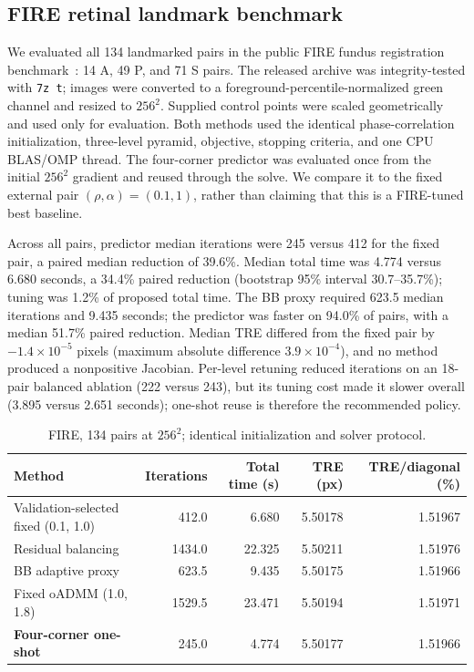 \documentclass[pdflatex,iicol,sn-mathphys-num]{sn-jnl}
\theoremstyle{definition}\newtheorem{definition}[theorem]{Definition}\newtheorem{remark}[theorem]{Remark}
\begin{document}
\subsection{FIRE retinal landmark benchmark}
We evaluated all 134 landmarked pairs in the public FIRE fundus registration
benchmark~\cite{HernandezMatas2017}: 14 A, 49 P, and 71 S pairs.  The released
archive was integrity-tested with \texttt{7z t}; images were converted to a
foreground-percentile-normalized green channel and resized to $256^2$.
Supplied control points were scaled geometrically and used only for evaluation.
Both methods used the identical phase-correlation initialization, three-level
pyramid, objective, stopping criteria, and one CPU BLAS/OMP thread.  The
four-corner predictor was evaluated once from the initial $256^2$
gradient and reused through the solve.  We compare it to the fixed external
pair $(\rho,\alpha)=(0.1,1)$, rather than claiming that this is a FIRE-tuned
best baseline.

Across all pairs, predictor median iterations were 245 versus 412 for the fixed
pair, a paired median reduction of 39.6\%. Median total time was 4.774 versus
6.680 seconds, a 34.4\% paired reduction (bootstrap 95\% interval 30.7--35.7\%);
tuning was 1.2\% of proposed total time. The BB proxy required 623.5 median
iterations and 9.435 seconds; the predictor was faster on 94.0\% of pairs, with
a median 51.7\% paired reduction. Median TRE differed from the fixed pair by
$-1.4\times10^{-5}$ pixels (maximum absolute difference $3.9\times10^{-4}$),
and no method produced a nonpositive Jacobian. Per-level retuning reduced
iterations on an 18-pair balanced ablation (222 versus 243), but its tuning cost
made it slower overall (3.895 versus 2.651 seconds); one-shot reuse is therefore
the recommended policy.

\begin{table}[ht]
\centering
\small
\caption{FIRE, 134 pairs at $256^2$; identical initialization and solver protocol.}
\begin{tabular}{p{}rrrr}
\toprule
Method & Iterations & Total time (s) & TRE (px) & TRE/diagonal (\%)\\
\midrule
Validation-selected fixed (0.1, 1.0) & 412.0 & 6.680 & 5.50178 & 1.51967\\
Residual balancing & 1434.0 & 22.325 & 5.50211 & 1.51976\\
BB adaptive proxy & 623.5 & 9.435 & 5.50175 & 1.51966\\
Fixed oADMM (1.0, 1.8) & 1529.5 & 23.471 & 5.50194 & 1.51971\\
\textbf{Four-corner one-shot} & 245.0 & 4.774 & 5.50177 & 1.51966\\
\bottomrule%
\end{tabular}
\end{table}
\end{document}
